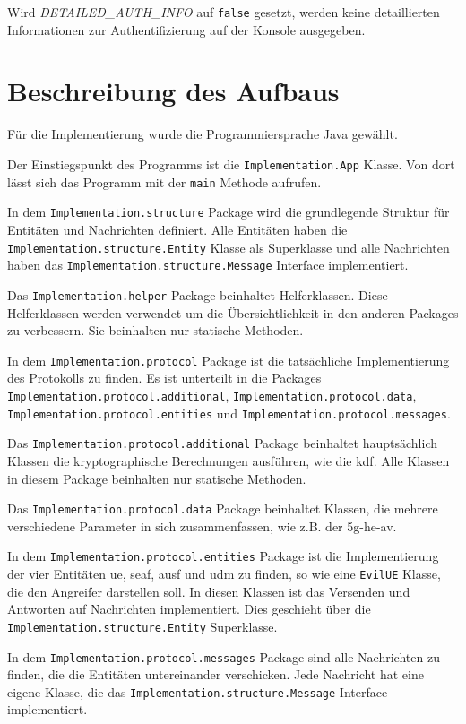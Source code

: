 Wird \textit{DETAILED\_AUTH\_INFO} auf \lstinline{false} gesetzt, werden keine detaillierten Informationen zur Authentifizierung auf der Konsole ausgegeben.


\section{Beschreibung des Aufbaus}
Für die Implementierung wurde die Programmiersprache Java gewählt.

Der Einstiegspunkt des Programms ist die \lstinline{Implementation.App} Klasse. Von dort lässt sich das Programm mit der \lstinline{main} Methode aufrufen.

In dem \lstinline{Implementation.structure} Package wird die grundlegende Struktur für Entitäten und Nachrichten definiert.
Alle Entitäten haben die \lstinline{Implementation.structure.Entity} Klasse als Superklasse und alle Nachrichten haben das \lstinline{Implementation.structure.Message} Interface implementiert.

Das \lstinline{Implementation.helper} Package beinhaltet Helferklassen.
Diese Helferklassen werden verwendet um die Übersichtlichkeit in den anderen Packages zu verbessern.
Sie beinhalten nur statische Methoden.

In dem \lstinline{Implementation.protocol} Package ist die tatsächliche Implementierung des Protokolls zu finden.
Es ist unterteilt in die Packages \lstinline{Implementation.protocol.additional}, \lstinline{Implementation.protocol.data}, \lstinline{Implementation.protocol.entities} und \lstinline{Implementation.protocol.messages}.

Das \lstinline{Implementation.protocol.additional} Package beinhaltet hauptsächlich Klassen die kryptographische Berechnungen ausführen, wie die \gls{kdf}.
Alle Klassen in diesem Package beinhalten nur statische Methoden.

Das \lstinline{Implementation.protocol.data} Package beinhaltet Klassen, die mehrere verschiedene Parameter in sich zusammenfassen, wie z.B. der \gls{5g-he-av}.

In dem \lstinline{Implementation.protocol.entities} Package ist die Implementierung der vier Entitäten \gls{ue}, \gls{seaf}, \gls{ausf} und \gls{udm} zu finden, so wie eine \lstinline{EvilUE} Klasse, die den Angreifer darstellen soll.
In diesen Klassen ist das Versenden und Antworten auf Nachrichten implementiert.
Dies geschieht über die \lstinline{Implementation.structure.Entity} Superklasse.

In dem \lstinline{Implementation.protocol.messages} Package sind alle Nachrichten zu finden, die die Entitäten untereinander verschicken.
Jede Nachricht hat eine eigene Klasse, die das \lstinline{Implementation.structure.Message} Interface implementiert.


